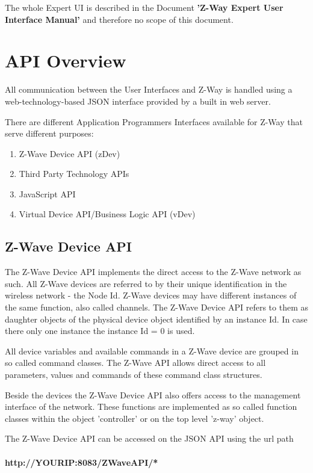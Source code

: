 The whole Expert UI is described in the Document 
\textbf{'Z-Way Expert User Interface Manual'} and therefore no scope of this document.


\section{API Overview}

All communication between the User Interfaces and Z-Way is handled using a 
web-technology-based  JSON interface provided by a built in web server.

There are different Application Programmers Interfaces available for Z-Way that serve 
different purposes:
\begin{enumerate}
\item Z-Wave Device API (zDev)
\item Third Party Technology APIs
\item JavaScript API
\item Virtual Device API/Business Logic API (vDev)
\end{enumerate}

\subsection{Z-Wave Device API}

The Z-Wave Device API implements the direct access to the Z-Wave network as such.
All Z-Wave devices are referred to by their unique identification in the wireless network - 
the Node Id. Z-Wave devices may have different instances of the same function, also 
called channels. The Z-Wave Device API refers to them as daughter objects of the 
physical device object identified by an instance Id. In case there only one instance the 
instance Id = 0  is used.

All device variables and available commands in a Z-Wave device are grouped in so called
command classes. The Z-Wave API allows direct access to all parameters, values and 
commands of these command class structures.

Beside the devices the Z-Wave Device API also offers access to the management interface
of the network. These functions are implemented as so called function classes within 
the object 'controller' or on the top level 'z-way' object.

The Z-Wave Device API can be accessed on the JSON API using the url path 



\paragraph{http://YOURIP:8083/ZWaveAPI/*}
